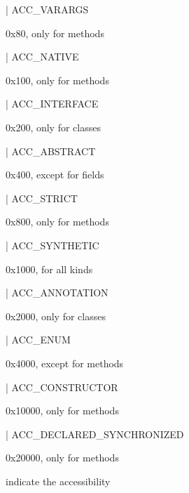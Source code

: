 \documentclass[11pt]{article}
\begin{document}
\begin{ocamldoccode}
  | ACC_VARARGS
\end{ocamldoccode}
\begin{ocamldoccomment}
0x80, only for methods
\end{ocamldoccomment}
\begin{ocamldoccode}
  | ACC_NATIVE
\end{ocamldoccode}
\begin{ocamldoccomment}
0x100, only for methods
\end{ocamldoccomment}
\begin{ocamldoccode}
  | ACC_INTERFACE
\end{ocamldoccode}
\begin{ocamldoccomment}
0x200, only for classes
\end{ocamldoccomment}
\begin{ocamldoccode}
  | ACC_ABSTRACT
\end{ocamldoccode}
\begin{ocamldoccomment}
0x400, except for fields
\end{ocamldoccomment}
\begin{ocamldoccode}
  | ACC_STRICT
\end{ocamldoccode}
\begin{ocamldoccomment}
0x800, only for methods
\end{ocamldoccomment}
\begin{ocamldoccode}
  | ACC_SYNTHETIC
\end{ocamldoccode}
\begin{ocamldoccomment}
0x1000, for all kinds
\end{ocamldoccomment}
\begin{ocamldoccode}
  | ACC_ANNOTATION
\end{ocamldoccode}
\begin{ocamldoccomment}
0x2000, only for classes
\end{ocamldoccomment}
\begin{ocamldoccode}
  | ACC_ENUM
\end{ocamldoccode}
\begin{ocamldoccomment}
0x4000, except for methods
\end{ocamldoccomment}
\begin{ocamldoccode}
  | ACC_CONSTRUCTOR
\end{ocamldoccode}
\begin{ocamldoccomment}
0x10000, only for methods
\end{ocamldoccomment}
\begin{ocamldoccode}
  | ACC_DECLARED_SYNCHRONIZED
\end{ocamldoccode}
\begin{ocamldoccomment}
0x20000, only for methods
\end{ocamldoccomment}
\begin{ocamldocdescription}
indicate the accessibility


\end{ocamldocdescription}
\end{document}
